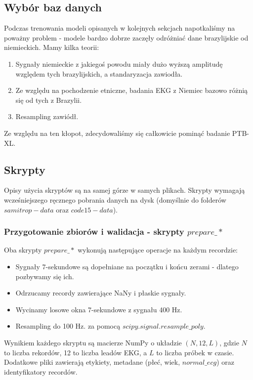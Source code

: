 \subsection*{Wybór baz danych}
Podczas trenowania modeli opisanych w kolejnych sekcjach napotkaliśmy na poważny problem -
modele bardzo dobrze zaczęły odróżniać dane brazylijskie od niemieckich. Mamy kilka teorii:
\begin{enumerate}
    \item Sygnały niemieckie z jakiegoś powodu miały dużo wyższą amplitudę względem tych
    brazylijskich, a standaryzacja zawiodła.
    \item Ze względu na pochodzenie etniczne, badania EKG z Niemiec bazowo różnią się od
    tych z Brazylii.
    \item Resampling zawiódł.
\end{enumerate}
Ze względu na ten kłopot, zdecydowaliśmy się całkowicie pominąć badanie PTB-XL.

\subsection{Skrypty}
Opisy użycia skryptów są na samej górze w samych plikach. Skrypty wymagają wcześniejszego ręcznego
pobrania danych na dysk (domyślnie do folderów $samitrop-data$ oraz $code15-data$).

\subsubsection*{Przygotowanie zbiorów i walidacja - skrypty $prepare\_*$}
Oba skrypty $prepare\_*$ wykonują następujące operacje na każdym recordzie:
\begin{itemize}
    \item Sygnały 7-sekundowe są dopełniane na początku i końcu zerami - dlatego pozbywamy się ich.
    \item Odrzucamy recordy zawierające NaNy i płaskie sygnały.
    \item Wycinamy losowe okna 7-sekundowe z sygnału 400 Hz.
    \item Resampling do 100 Hz.
    za pomocą $scipy.signal.resample\_poly$.
\end{itemize}

Wynikiem każdego skryptu są macierze NumPy o układzie $(N, 12, L)$, gdzie $N$ to liczba
rekordów, 12 to liczba leadów EKG, a $L$ to liczba próbek w czasie. Dodatkowe pliki zawierają etykiety, metadane
(płeć, wiek, $normal\_ecg$) oraz identyfikatory recordów.

